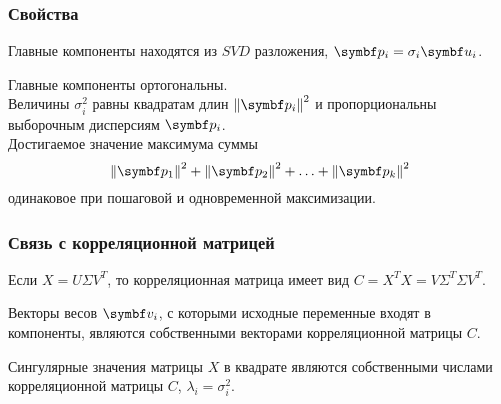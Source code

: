 \begin{frame}
  \frametitle{Свойства}

  Главные компоненты находятся из $SVD$ разложения, $\bp_i = \sigma_i \bu_i$. \pause

  Главные компоненты ортогональны. \\

  Величины $\sigma^2_i$ равны квадратам длин $\norm{\bp_i}^2$ 
  и пропорциональны выборочным дисперсиям $\bp_i$.  \\

  Достигаемое значение максимума суммы 
  \[
    \norm{\bp_1}^2 + \norm{\bp_2}^2 + \ldots + \norm{\bp_k}^2
  \]
  одинаковое при пошаговой и одновременной максимизации.


\end{frame}


\begin{frame}
  \frametitle{Связь с корреляционной матрицей}
  Если $X = U\Sigma V^T$, то корреляционная матрица имеет вид $C=X^TX = V\Sigma^T \Sigma V^T$. \pause

  Векторы весов $\bv_i$, с которыми исходные переменные входят в компоненты, являются
  собственными векторами корреляционной матрицы $C$. \pause

  Сингулярные значения матрицы $X$ в квадрате являются собственными числами 
  корреляционной матрицы $C$, $\lambda_i = \sigma_i^2$.
  

\end{frame}